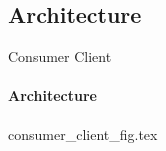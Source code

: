 \subsection{Architecture}

\begin{frame}{Consumer Client}
    \framesubtitle{Architecture}
    {consumer_client_fig.tex}
\end{frame}
